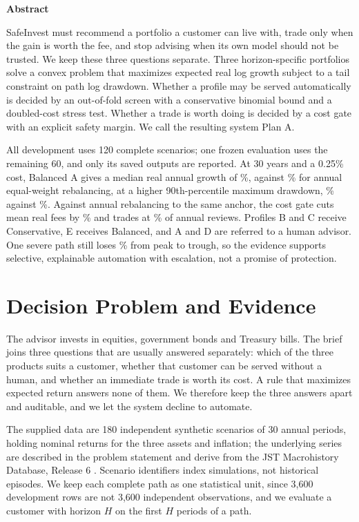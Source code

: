 \begin{center}\textbf{Abstract}\end{center}
SafeInvest must recommend a portfolio a customer can live with, trade only when the gain is worth the fee, and stop advising when its own model should not be trusted. We keep these three questions separate. Three horizon-specific portfolios solve a convex problem that maximizes expected real log growth subject to a tail constraint on path log drawdown. Whether a profile may be served automatically is decided by an out-of-fold screen with a conservative binomial bound and a doubled-cost stress test. Whether a trade is worth doing is decided by a cost gate with an explicit safety margin. We call the resulting system Plan A.

All development uses 120 complete scenarios; one frozen evaluation uses the remaining 60, and only its saved outputs are reported. At 30 years and a 0.25\% cost, Balanced A gives a median real annual growth of \BalancedGrowth\%, against \EqualGrowth\% for annual equal-weight rebalancing, at a higher 90th-percentile maximum drawdown, \BalancedPninety\% against \EqualPninety\%. Against annual rebalancing to the same anchor, the cost gate cuts mean real fees by \CostSaving\% and trades at \BalancedTrades\% of annual reviews. Profiles B and C receive Conservative, E receives Balanced, and A and D are referred to a human advisor. One severe path still loses \SevereLoss\% from peak to trough, so the evidence supports selective, explainable automation with escalation, not a promise of protection.

\section{Decision Problem and Evidence}
The advisor invests in equities, government bonds and Treasury bills. The brief joins three questions that are usually answered separately: which of the three products suits a customer, whether that customer can be served without a human, and whether an immediate trade is worth its cost. A rule that maximizes expected return answers none of them. We therefore keep the three answers apart and auditable, and we let the system decline to automate.

The supplied data are 180 independent synthetic scenarios of 30 annual periods, holding nominal returns for the three assets and inflation; the underlying series are described in the problem statement and derive from the JST Macrohistory Database, Release 6 \cite{problem,jst}. Scenario identifiers index simulations, not historical episodes. We keep each complete path as one statistical unit, since 3,600 development rows are not 3,600 independent observations, and we evaluate a customer with horizon $H$ on the first $H$ periods of a path.

